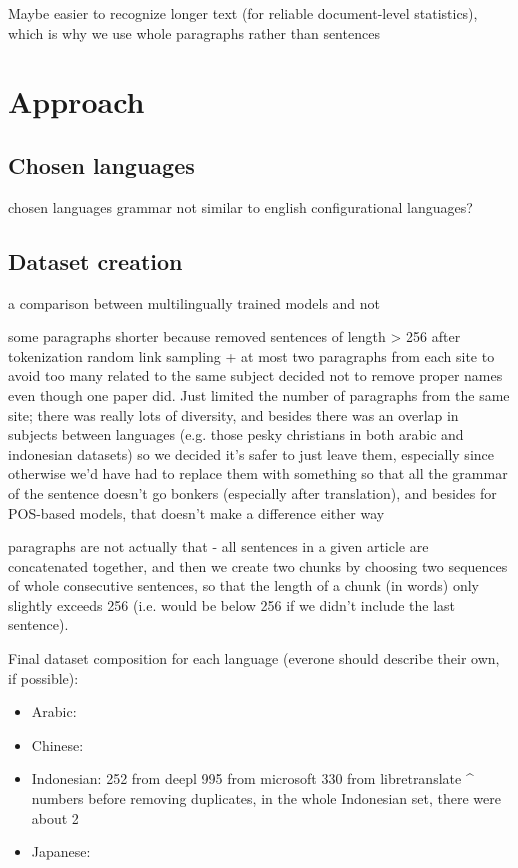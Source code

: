 \documentclass[twocolumn]{article}
\begin{document}
Maybe easier to recognize longer text (for reliable document-level statistics), which is why we use whole paragraphs rather than sentences




\section*{Approach}

\subsection*{Chosen languages}

chosen languages
grammar not similar to english
configurational languages?

\subsection*{Dataset creation}

a comparison between multilingually trained models and not

some paragraphs shorter because removed sentences of length > 256 after tokenization
random link sampling + at most two paragraphs from each site to avoid too many related to the same subject
decided not to remove proper names even though one paper did. Just limited the number of paragraphs from the same site; there was really lots of diversity, and besides there was an overlap in subjects between languages (e.g. those pesky christians in both arabic and indonesian datasets) so we decided it's safer to just leave them, especially since otherwise we'd have had to replace them with something so that all the grammar of the sentence doesn't go bonkers (especially after translation), and besides for POS-based models, that doesn't make a difference either way

paragraphs are not actually that - all sentences in a given article are concatenated together, and then we create two chunks by choosing two sequences of whole consecutive sentences, so that the length of a chunk (in words) only slightly exceeds 256 (i.e. would be below 256 if we didn't include the last sentence).

Final dataset composition for each language (everone should describe their own, if possible):

\begin{itemize}
	\item Arabic:
	\item Chinese:
	\item Indonesian:
	252 from deepl
995 from  microsoft
330 from  libretranslate
^ numbers before removing duplicates, in the whole Indonesian set, there were about 2%
	\item Japanese:
\end{itemize}
\end{document}
